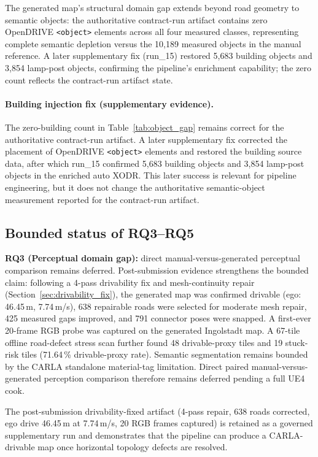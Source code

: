 \noindent The generated map's structural domain gap extends beyond road geometry to semantic objects: the authoritative contract-run artifact contains zero OpenDRIVE \texttt{<object>} elements across all four measured classes, representing complete semantic depletion versus the 10{,}189 measured objects in the manual reference. A later supplementary fix (run\_15) restored 5{,}683 building objects and 3{,}854 lamp-post objects, confirming the pipeline's enrichment capability; the zero count reflects the contract-run artifact state.

\paragraph{Building injection fix (supplementary evidence).}
The zero-building count in Table~\ref{tab:object_gap} remains correct for the authoritative contract-run artifact. A later supplementary fix corrected the placement of OpenDRIVE \texttt{<object>} elements and restored the building source data, after which run\_15 confirmed 5,683 building objects and 3,854 lamp-post objects in the enriched auto XODR. This later success is relevant for pipeline engineering, but it does not change the authoritative semantic-object measurement reported for the contract-run artifact.

\subsection{Bounded status of RQ3--RQ5}
\textbf{RQ3 (Perceptual domain gap):} direct manual-versus-generated perceptual comparison remains deferred. Post-submission evidence strengthens the bounded claim: following a 4-pass drivability fix and mesh-continuity repair (Section~\ref{sec:drivability_fix}), the generated map was confirmed drivable (ego: 46.45\,m, 7.74\,m/s), 638 repairable roads were selected for moderate mesh repair, 425 measured gaps improved, and 791 connector poses were snapped. A first-ever 20-frame RGB probe was captured on the generated Ingolstadt map. A 67-tile offline road-defect stress scan further found 48 drivable-proxy tiles and 19 stuck-risk tiles (71.64\,\% drivable-proxy rate). Semantic segmentation remains bounded by the CARLA standalone material-tag limitation. Direct paired manual-versus-generated perception comparison therefore remains deferred pending a full UE4 cook.

The post-submission drivability-fixed artifact (4-pass repair, 638 roads corrected, ego drive 46.45\,m at 7.74\,m/s, 20 RGB frames captured) is retained as a governed supplementary run and demonstrates that the pipeline can produce a CARLA-drivable map once horizontal topology defects are resolved.

